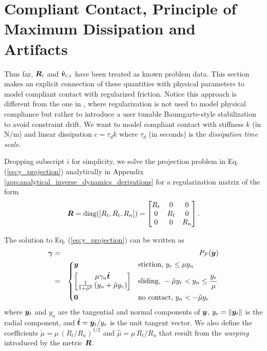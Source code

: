 \section{Compliant Contact, Principle of Maximum Dissipation and Artifacts}
\label{sec:physical_intuition}

Thus far, ${\bm{R}}_i$ and $\hat{{\bm{v}}}_{c,i}$ have been treated as known problem
data. This section makes an explicit connection of these quantities with
physical parameters to model compliant contact with regularized friction. Notice
this approach is different from the one in \cite{bib:todorov2014}, where
regularization is not used to model physical compliance but rather to introduce
a user tunable Baumgarte-style stabilization to avoid constraint drift. We want
to model compliant contact with stiffness $k$ (in N/m) and linear
dissipation $c = \tau_d k$ where $\tau_d$ (in seconds) is the \textit{dissipation
time scale}. 

Dropping subscript $i$ for simplicity, we solve the projection problem in Eq.
(\ref{eq:y_projection}) analytically in Appendix
\ref{app:analytical_inverse_dynamics_derivations} for a regularization matrix of
the form
\begin{align}	
	\vf{R} = \text{diag}([R_t, R_t, R_n]) = 
	\begin{bmatrix}
		R_t &   0 & 0\\
		  0 & R_t & 0\\
		  0 &   0 & R_n
	\end{bmatrix}.
    \label{eq:Rk}
\end{align} 

The solution to  Eq. (\ref{eq:y_projection}) can be written as
\begin{eqnarray}
	\bgamma &=& P_\mathcal{F}(\vf{y})
    \label{eq:analytical_y_projection}\\
    &=&\begin{dcases}
	\vf{y} 
	& \text{stiction, } y_r \le \mu y_n\\
	\begin{bmatrix}
		\mu\gamma_n\hat{\vf{t}}\\
		\frac{1}{1+\tilde\mu^2}\left(y_n +
        \hat\mu y_r\right)
	\end{bmatrix}
	& \text{sliding, } -\hat\mu y_r < y_n \leq \frac{y_r}{\mu}\\
    \vf{0} & \text{no contact, } y_n < -\hat\mu y_r
\end{dcases}\nonumber	
\end{eqnarray}
where ${\bm{y}}_t$ and $y_n$ are the tangential and normal components of ${\bm{y}}$,
$y_r=\Vert{\bm{y}}_t\Vert$ is the radial component, and $\hat{{\bm{t}}}={\bm{y}}_t/y_r$
is the unit tangent vector. We also define the coefficients
$\tilde\mu=\mu\,(R_t/R_n)^{1/2}$ and $\hat\mu=\mu\,R_t/R_n$ that
result from the \textit{warping} introduced by the metric ${\bm{R}}$.

